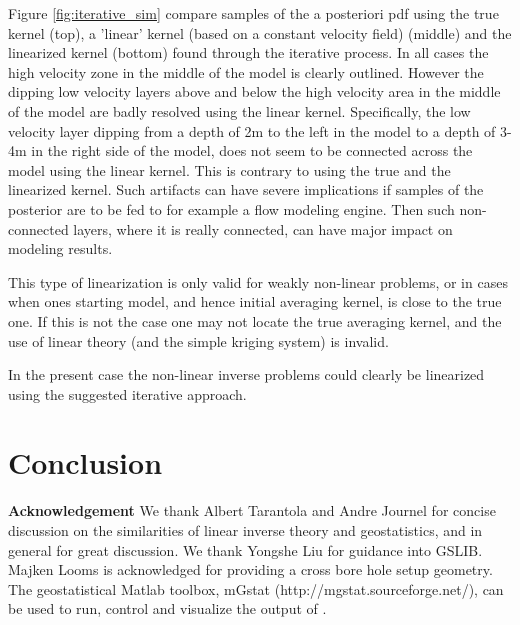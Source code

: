 \documentclass[12t]{article}
\begin{document}
Figure \ref{fig:iterative_sim} compare samples of the a posteriori pdf using the true kernel (top), a 'linear' kernel (based on a constant velocity field) (middle) and the linearized kernel (bottom) found through the iterative process. In all cases the high velocity zone in the middle of the model is clearly outlined. However the dipping low velocity layers above and below the high velocity area in the middle of the model are badly resolved using the linear kernel. Specifically, the low velocity layer dipping from a depth of 2m to the left in the model to a depth of 3-4m in the right side of the model, does not seem to be connected across the model using the linear kernel. This is contrary to using the true and the linearized kernel. 
Such artifacts can have severe implications if samples of the posterior are to be fed to for example a flow modeling engine. Then such non-connected layers, where it is really connected, can have major impact on modeling results.


This type of linearization is only valid for weakly non-linear problems, or in cases when ones starting model, and hence initial averaging kernel, is close to the true one. If this is not the case one may not locate the true averaging kernel, and the use of linear theory (and the simple kriging system) is invalid.

In the present case the non-linear inverse problems could clearly be linearized using the suggested iterative approach.
\vspace{1cm}

\section{Conclusion}
\label{sec:conclusion}

\textbf{Acknowledgement}
We thank Albert Tarantola and Andre Journel for concise discussion on the similarities of linear inverse theory and geostatistics, and in general for great discussion. We thank Yongshe Liu for guidance into GSLIB. Majken Looms is acknowledged for providing a cross bore hole setup geometry. The geostatistical Matlab toolbox, mGstat (http://mgstat.sourceforge.net/), can be used to run, control and visualize the output of \visimprog.


\nocite{Robertson:2006:DSSIM}
\nocite{Soares:2001:DSS}
\nocite{Oz:2003:DSSIM-HR}
\nocite{Journel:1978:MG}
\nocite{Journel:1999:VOL}
\nocite{Goovaerts:1997}
\nocite{Soares:2001:DSS}
\nocite{Oz:2003:DSSIM-HR}
\nocite{Deutsch:2000:DSSIM-HR}
\nocite{GSLIB}
\nocite{Hansen:2006:geostatinv}
\nocite{Liu:2006:FFTcov}
\end{document}
